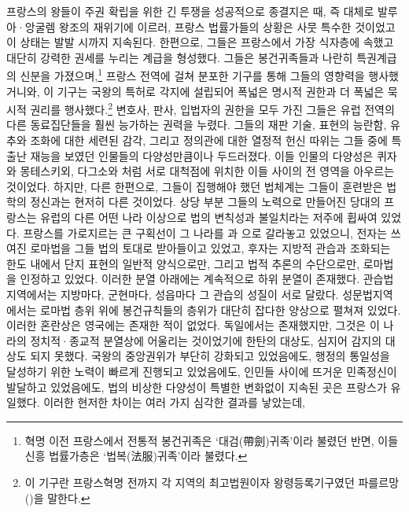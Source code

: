 프랑스의 왕들이 주권 확립을 위한 긴 투쟁을 성공적으로 종결지은 때,
즉 대체로 발루아·앙굴렘 왕조의 재위기에 이르러,
프랑스 법률가들의 상황은 사뭇 특수한 것이었고 이 상태는
 발발 시까지 지속된다.
한편으로, 그들은 프랑스에서 가장 식자층에 속했고
대단히 강력한 권세를 누리는 계급을 형성했다.
그들은 봉건귀족들과 나란히 특권계급의 신분을 가졌으며,\footnote{%
  혁명 이전 프랑스에서
  전통적 봉건귀족은 `대검(帶劍)귀족'이라 불렸던 반면, 이들 신흥 법률가층은
  `법복(法服)귀족'이라 불렸다. }
프랑스 전역에 걸쳐 분포한 기구를 통해 그들의 영향력을 행사했거니와,
이 기구는 국왕의 특허로 각지에 설립되어
폭넓은 명시적 권한과 더 폭넓은 묵시적 권리를 행사했다.\footnote{%
  이 기구란 프랑스혁명 전까지 각 지역의 최고법원이자 왕령등록기구였던
  파를르망()을 말한다. }
변호사, 판사, 입법자의 권한을 모두 가진 그들은 유럽 전역의 다른 동료집단들을
훨씬 능가하는 권력을 누렸다.
그들의 재판 기술, 표현의 능란함, 유추와 조화에 대한 세련된 감각,
그리고 
정의관에 대한 열정적 헌신
따위는 그들 중에 특출난 재능을 보였던 인물들의 다양성만큼이나 두드러졌다.
이들 인물의 다양성은
퀴자와 몽테스키외,
다그소와
처럼 서로 대척점에 위치한 이들 사이의
전 영역을 아우르는 것이었다.
하지만, 다른 한편으로, 그들이 집행해야 했던 법체계는
그들이 훈련받은 법학의 정신과는 현저히 다른 것이었다.
상당 부분 그들의 노력으로 만들어진 당대의 프랑스는
유럽의 다른 어떤 나라 이상으로 법의 변칙성과 불일치라는 저주에 휩싸여 있었다.
프랑스를 가로지르는 큰 구획선이 그 나라를
과
으로 갈라놓고 있었으니,
전자는 쓰여진 로마법을 그들 법의 토대로 받아들이고 있었고,
후자는 지방적 관습과 조화되는 한도 내에서
단지 표현의 일반적 양식으로만, 그리고
법적 추론의 수단으로만, 로마법을 인정하고 있었다.
이러한 분열 아래에는 계속적으로 하위 분열이 존재했다.
관습법지역에서는 지방마다,
군현마다,
성읍마다 그 관습의 성질이 서로 달랐다.
성문법지역에서는
로마법 층위 위에 봉건규칙들의 층위가 대단히 잡다한 양상으로
펼쳐져 있었다.
이러한 혼란상은 영국에는 존재한 적이 없었다.
독일에서는 존재했지만, 그것은 이 나라의 정치적·종교적 분열상에
어울리는 것이었기에 한탄의 대상도, 심지어 감지의 대상도 되지 못했다.
국왕의 중앙권위가 부단히 강화되고 있었음에도,
행정의 통일성을 달성하기 위한 노력이 빠르게 진행되고 있었음에도,
인민들 사이에 뜨거운 민족정신이 발달하고 있었음에도,
법의 비상한 다양성이 특별한 변화없이 지속된 곳은 프랑스가 유일했다.
이러한 현저한 차이는 여러 가지 심각한 결과를 낳았는데,
